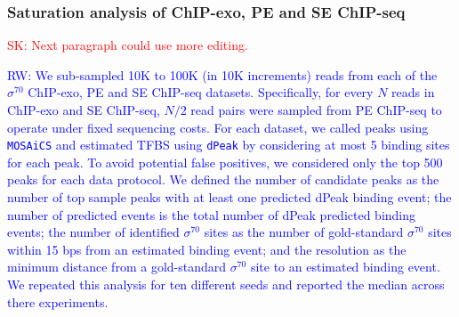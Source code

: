 \documentclass{bmcart}
\newcommand{\SK}[1]{\textcolor{red}{SK: #1}}
\newcommand{\RW}[1]{\textcolor{blue}{RW: #1}}
\newcommand{\sig}{\sigma^{70}}
\begin{document}

%





\subsubsection*{Saturation analysis of ChIP-exo, PE and SE ChIP-seq}
\SK{Next paragraph could use more editing.}

\RW{
We sub-sampled 10K to 100K (in 10K increments) reads from each of the
$\sig$ ChIP-exo, PE and SE ChIP-seq datasets. Specifically, for every
$N$ reads in ChIP-exo and SE ChIP-seq, $N/2$ read pairs were sampled
from PE ChIP-seq to operate under fixed sequencing costs. For each
dataset, we called peaks using \texttt{MOSAiCS} \cite{mosaics} and
estimated TFBS using \texttt{dPeak} \cite{dpeak} by considering at
most 5 binding sites for each peak. To avoid potential false
positives, we considered only the top 500 peaks for each data
protocol. We defined the number of candidate peaks as the number of
top sample peaks with at least one predicted dPeak binding event; the
number of predicted events is the total number of dPeak predicted
binding events; the number of identified $\sig$ sites as the number of
gold-standard $\sig$ sites within 15 bps from an estimated binding
event; and the resolution as the minimum distance from a gold-standard
$\sig$ site to an estimated binding event. We repeated this analysis
for ten different seeds and reported the median across there
experiments.
}
\end{document}
